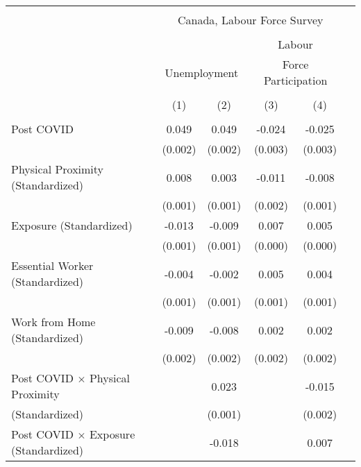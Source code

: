 \begin{tabular*}{\textwidth}{ @{\extracolsep{\fill}}l*{5}{c}}
\hline\hline
\\
 &\multicolumn{4}{c}{Canada, Labour Force Survey} \\
\cline{2-5} \\
&\multicolumn{2}{c}{} &\multicolumn{2}{c}{Labour} \\
&\multicolumn{2}{c}{Unemployment} &\multicolumn{2}{c}{Force Participation} \\
\cline{2-3} \cline{4-5} \\
                                                       &\multicolumn{1}{c}{(1)}     &\multicolumn{1}{c}{(2)}     &\multicolumn{1}{c}{(3)}     &\multicolumn{1}{c}{(4)}\\
\hline
\\
Post COVID                                             &0.049     &0.049     &-0.024     &-0.025\\
                                                       &(0.002)     &(0.002)     &(0.003)     &(0.003)\\[0.5em]
%
Physical Proximity (Standardized)                      &0.008     &0.003     &-0.011     &-0.008\\
                                                       &(0.001)     &(0.001)     &(0.002)     &(0.001)\\[0.5em]
%
Exposure (Standardized)                                &-0.013     &-0.009     &0.007     &0.005\\
                                                       &(0.001)     &(0.001)     &(0.000)     &(0.000)\\[0.5em]
%
Essential Worker (Standardized)                        &-0.004     &-0.002     &0.005     &0.004\\
                                                       &(0.001)     &(0.001)     &(0.001)     &(0.001)\\[0.5em]
%
Work from Home (Standardized)                          &-0.009     &-0.008     &0.002     &0.002\\
                                                       &(0.002)     &(0.002)     &(0.002)     &(0.002)\\[0.5em]
%
Post COVID $\times$ Physical Proximity                 &         &0.023     &         &-0.015\\
(Standardized)                                         &         &(0.001)     &         &(0.002)\\[0.5em]
%
Post COVID $\times$ Exposure (Standardized)            &         &-0.018     &         &0.007\\

\end{tabular*}
